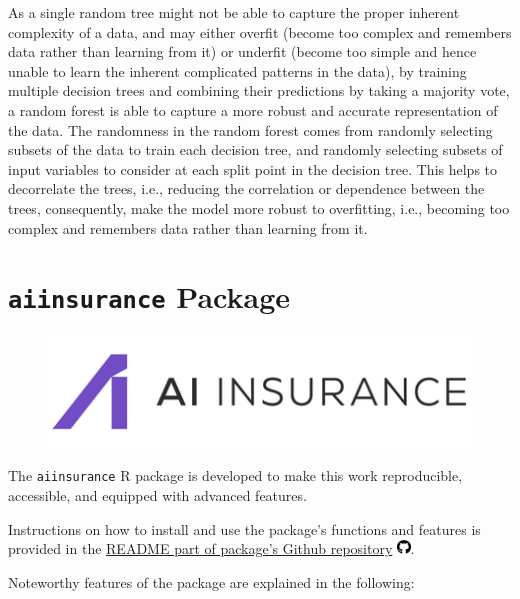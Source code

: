 \documentclass{article}
\begin{document}
As a single random tree might not be able to capture the proper inherent
complexity of a data, and may either overfit (become too complex and
remembers data rather than learning from it) or underfit (become too
simple and hence unable to learn the inherent complicated patterns in
the data), by training multiple decision trees and combining their
predictions by taking a majority vote, a random forest is able to
capture a more robust and accurate representation of the data. The
randomness in the random forest comes from randomly selecting subsets of
the data to train each decision tree, and randomly selecting subsets of
input variables to consider at each split point in the decision tree.
This helps to decorrelate the trees, i.e., reducing the correlation or
dependence between the trees, consequently, make the model more robust
to overfitting, i.e., becoming too complex and remembers data rather
than learning from it.

\hypertarget{aiinsurance-package}{%
\section{\texorpdfstring{\texttt{aiinsurance} Package
\label{sec:package}}{aiinsurance Package }}\label{aiinsurance-package}}

\begin{figure}
\includegraphics[width=0.9\linewidth]{"./figures/logo.png"}
\end{figure}

The \texttt{aiinsurance} R package \cite{package} is developed to make
this work reproducible, accessible, and equipped with advanced features.

Instructions on how to install and use the package's functions and
features is provided in the
\href{https://github.com/berserkhmdvhb/aiinsurance\#readme}{README part
of package's Github repository}
\includegraphics[width=0.97em,height=1em]{report_files/figure-latex/fa-icon-9e25601f72c0b4fff1c079a486ca8bba.pdf}.

Noteworthy features of the package are explained in the following:
\end{document}
